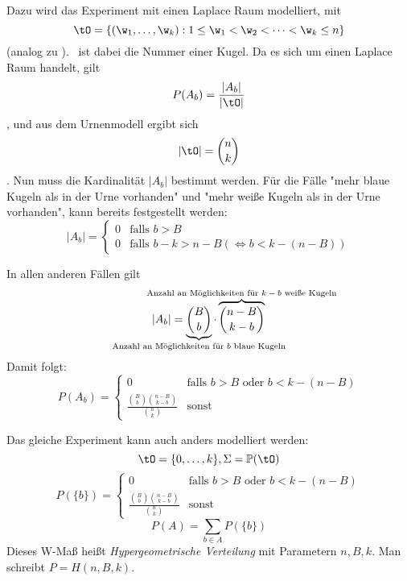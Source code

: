 Dazu wird das Experiment mit einen Laplace Raum modelliert, mit
\begin{equation*}
    \tO = \{ (\w_1, \dots ,\w_k): 1 \leq \w_1 < \w_2 < \dots < \w_k \leq n \}
\end{equation*}
(analog zu ). \w\ ist dabei die Nummer einer Kugel.
Da es sich um einen Laplace Raum handelt, gilt
\begin{equation*}
    P(A_b) = \frac{|A_b|}{|\tO|}
\end{equation*},
und aus dem Urnenmodell ergibt sich
\begin{equation*}
    |\tO| = \binom{n}{k}
\end{equation*}.
Nun muss die Kardinalität $|A_b|$ bestimmt werden.
Für die Fälle "mehr blaue Kugeln als in der Urne vorhanden" und
"mehr weiße Kugeln als in der Urne vorhanden", kann bereits festgestellt werden:
\begin{equation*}
    |A_b| = \begin{cases}
        0 & \text{falls } b>B                      \\
        0 & \text{falls } b-k>n-B (\iff b<k-(n-B))
    \end{cases}
\end{equation*}

In allen anderen Fällen gilt
\begin{equation*}
    |A_b| = \underbrace{\binom{B}{b}}_\text{
        \hidewidth
        Anzahl an Möglichkeiten für $b$ blaue Kugeln
        \hidewidth} \cdot
    \overbrace{\binom{n-B}{k-b}}^\text{
        \hidewidth
        Anzahl an Möglichkeiten für $k-b$ weiße Kugeln
        \hidewidth }
\end{equation*}
Damit folgt:
\begin{equation*}
    P(A_b)= \begin{cases}
        0                                                  & \text{falls } b>B \text{ oder } b<k-(n-B) \\
        \frac{\binom{B}{b} \binom{n-B}{k-b}}{\binom{n}{k}} & \text{sonst}
    \end{cases}
\end{equation*}

Das gleiche Experiment kann auch anders modelliert werden:
\begin{equation*}
    \tO = \{ 0, \dots ,k \}, \Sigma = \mathbb{P}(\tO)
\end{equation*}
\begin{equation*}
    P(\{b\}) = \begin{cases}
        0                                                  & \text{falls } b>B \text{ oder } b<k-(n-B) \\
        \frac{\binom{B}{b} \binom{n-B}{k-b}}{\binom{n}{k}} & \text{sonst}
    \end{cases}
\end{equation*}
\begin{equation*}
    P(A) = \sum_{b \in A} P(\{b\})
\end{equation*}
Dieses W-Maß heißt \emph{Hypergeometrische Verteilung} mit Parametern $n, B, k$.
Man schreibt $P=H(n,B,k)$.

